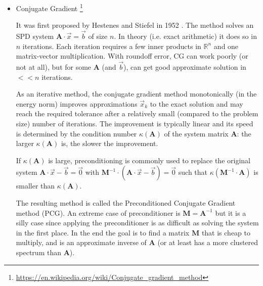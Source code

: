 \begin{itemize}
\item {\color{purple} Conjugate Gradient}
\footnote{\url{https://en.wikipedia.org/wiki/Conjugate_gradient_method}} 

It was first proposed by Hestenes and Stiefel in 1952 \cite{hest52}.
The method solves an SPD system ${\bm A}\cdot \vec{x} = \vec{b}$ of size $n$.
In theory (i.e. exact arithmetic) it does so in $n$ iterations.
Each iteration requires a few inner products in $\mathbb{R}^n$ and one matrix-vector multiplication.
With roundoff error, CG can work poorly (or not at all), but for some 
${\bm A}$ (and $\vec{b}$), can get good approximate solution in $<<n$ iterations.

As an iterative method, the conjugate gradient method monotonically (in the energy norm) 
improves approximations $\vec{x}_k$ to the exact solution and
may reach the required tolerance after a relatively small (compared to the problem size) number 
of iterations. The improvement is typically linear and its speed is determined by the 
condition number $\kappa({\bm A})$ of the system matrix ${\bm A}$: 
the larger $\kappa({\bm A})$ is, the slower the improvement.

If $\kappa({\bm A})$ is large, preconditioning is commonly used to replace the 
original system ${\bm A} \cdot \vec{x}-\vec{b}=\vec{0}$ 
with ${\bm M}^{-1}\cdot ({\bm A} \cdot \vec{x}-\vec{b})=\vec{0}$ 
such that $\kappa({\bm M}^{-1}\cdot {\bm A})$ 
is smaller than $\kappa({\bm A})$. 

The resulting method is called the Preconditioned Conjugate Gradient method (PCG).
An extreme case of preconditioner is ${\bm M}={\bm A}^{-1}$ but it is a silly case
since applying the preconditioner is as difficult as solving the system in the 
first place.
In the end the goal is to find a matrix ${\bm M}$ that is cheap to multiply, 
and is an approximate inverse of ${\bm A}$ 
(or at least has a more clustered spectrum than ${\bm A}$).


\end{itemize}
